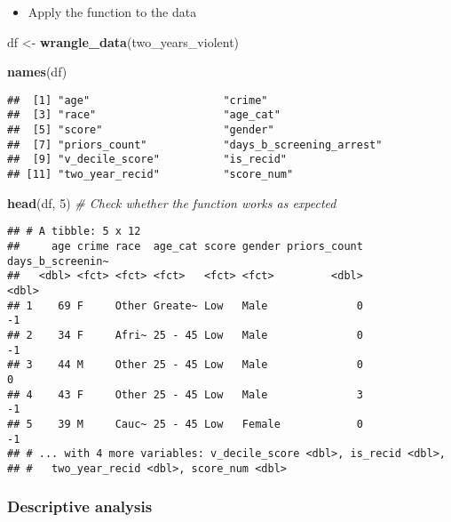 \documentclass[
]{book}
\newenvironment{Shaded}{\begin{snugshade}}{\end{snugshade}}
\newcommand{\CommentTok}[1]{\textcolor[rgb]{0.56,0.35,0.01}{\textit{#1}}}
\newcommand{\DecValTok}[1]{\textcolor[rgb]{0.00,0.00,0.81}{#1}}
\newcommand{\KeywordTok}[1]{\textcolor[rgb]{0.13,0.29,0.53}{\textbf{#1}}}
\newcommand{\NormalTok}[1]{#1}
\newcommand{\StringTok}[1]{\textcolor[rgb]{0.31,0.60,0.02}{#1}}
\providecommand{\tightlist}{%
  \setlength{\itemsep}{0pt}\setlength{\parskip}{0pt}}
\begin{document}
\begin{itemize}
\tightlist
\item
  Apply the function to the data
\end{itemize}

\begin{Shaded}
\begin{Highlighting}[]
\NormalTok{df \textless{}{-}}\StringTok{ }\KeywordTok{wrangle\_data}\NormalTok{(two\_years\_violent)}

\KeywordTok{names}\NormalTok{(df)}
\end{Highlighting}
\end{Shaded}

\begin{verbatim}
##  [1] "age"                     "crime"                  
##  [3] "race"                    "age_cat"                
##  [5] "score"                   "gender"                 
##  [7] "priors_count"            "days_b_screening_arrest"
##  [9] "v_decile_score"          "is_recid"               
## [11] "two_year_recid"          "score_num"
\end{verbatim}

\begin{Shaded}
\begin{Highlighting}[]
\KeywordTok{head}\NormalTok{(df, }\DecValTok{5}\NormalTok{) }\CommentTok{\# Check whether the function works as expected }
\end{Highlighting}
\end{Shaded}

\begin{verbatim}
## # A tibble: 5 x 12
##     age crime race  age_cat score gender priors_count days_b_screenin~
##   <dbl> <fct> <fct> <fct>   <fct> <fct>         <dbl>            <dbl>
## 1    69 F     Other Greate~ Low   Male              0               -1
## 2    34 F     Afri~ 25 - 45 Low   Male              0               -1
## 3    44 M     Other 25 - 45 Low   Male              0                0
## 4    43 F     Other 25 - 45 Low   Male              3               -1
## 5    39 M     Cauc~ 25 - 45 Low   Female            0               -1
## # ... with 4 more variables: v_decile_score <dbl>, is_recid <dbl>,
## #   two_year_recid <dbl>, score_num <dbl>
\end{verbatim}

\hypertarget{descriptive-analysis-1}{%
\subsubsection{Descriptive analysis}\label{descriptive-analysis-1}}
\end{document}
